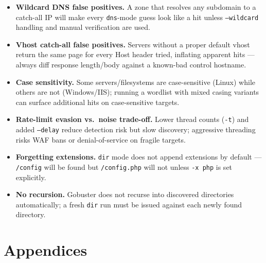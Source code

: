\documentclass[11pt]{article}
\begin{document}
\begin{itemize}
    \item \textbf{Wildcard DNS false positives.} A zone that resolves any subdomain to a catch-all IP will make every \texttt{dns}-mode guess look like a hit unless \texttt{--wildcard} handling and manual verification are used.
    \item \textbf{Vhost catch-all false positives.} Servers without a proper default vhost return the same page for every Host header tried, inflating apparent hits --- always diff response length/body against a known-bad control hostname.
    \item \textbf{Case sensitivity.} Some servers/filesystems are case-sensitive (Linux) while others are not (Windows/IIS); running a wordlist with mixed casing variants can surface additional hits on case-sensitive targets.
    \item \textbf{Rate-limit evasion vs.\ noise trade-off.} Lower thread counts (\texttt{-t}) and added \texttt{--delay} reduce detection risk but slow discovery; aggressive threading risks WAF bans or denial-of-service on fragile targets.
    \item \textbf{Forgetting extensions.} \texttt{dir} mode does not append extensions by default --- \texttt{/config} will be found but \texttt{/config.php} will not unless \texttt{-x php} is set explicitly.
    \item \textbf{No recursion.} Gobuster does not recurse into discovered directories automatically; a fresh \texttt{dir} run must be issued against each newly found directory.
\end{itemize}


\newpage
\section*{Appendices}
\end{document}
